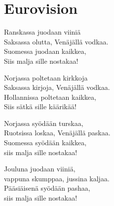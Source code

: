 \section{Eurovision}

Ranskassa juodaan viiniä \\
Saksassa olutta, Venäjällä vodkaa. \\
Suomessa juodaan kaikkea, \\
Siis malja sille nostakaa!

Norjassa poltetaan kirkkoja\\
Saksassa kirjoja, Venäjällä vodkaa.\\
Hollannissa poltetaan kaikkea,\\
Siis sätkä sille käärikää!

Norjassa syödään turskaa,\\
Ruotsissa loskaa, Venäjällä paskaa.\\
Suomessa syödään kaikkea,\\
siis malja sille nostakaa!

Jouluna juodaan viiniä,\\
vappuna skumppaa, jussina kaljaa.\\
Pääsiäisenä syödään pashaa,\\
siis malja sille nostakaa!